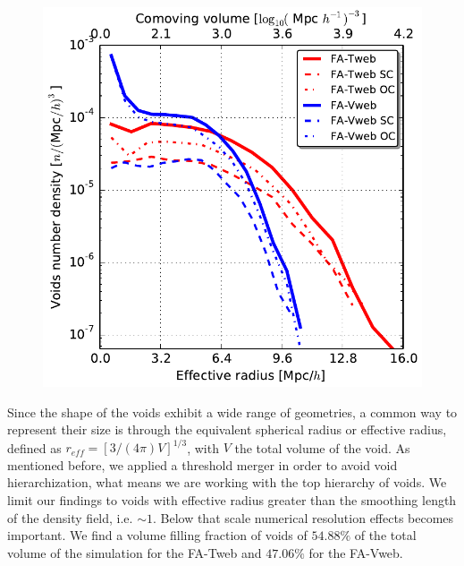 \documentclass[a4,useAMS,usenatbib,usegraphicx]{latex/mn2e}
\begin{document}
\begin{figure}
\centering

  \includegraphics[trim = 0mm 0mm 0mm 0mm, clip, keepaspectratio=true,
  width=0.3\textheight]{./figures/voids_regions_volume_all.pdf}


  \label{fig:volume_function}

\end{figure}


Since the shape of the voids exhibit a wide range of geometries, a common 
way to represent their size is through the equivalent spherical radius or
effective radius, defined as $r_{eff} = [3/(4\pi)V]^{1/3}$, with $V$ the 
total volume of the void. As mentioned before, we applied a threshold merger
in order to avoid void hierarchization, what means we are working with the
top hierarchy of voids. We limit our findings to voids with effective radius
greater than the smoothing length of the density field, i.e. $\sim 1$\hMpc. 
Below that scale numerical resolution effects becomes important. We find a
volume filling fraction of voids of $54.88\%$ of the total volume of the 
simulation for the FA-Tweb and $47.06\%$ for the FA-Vweb.
\end{document}

